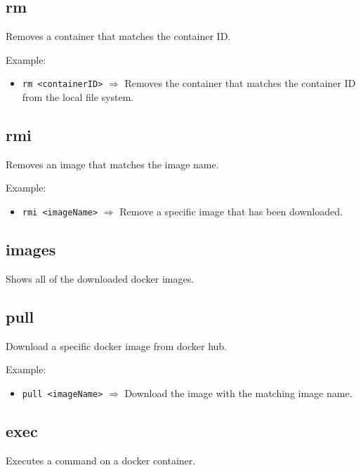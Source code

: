 \documentclass[a4paper, 12pt]{article}
\begin{document}
\subsection{rm}

Removes a container that matches the container ID.

\vspace{0.5em}
Example:
\begin{itemize}
	\item \texttt{rm <containerID>} $\Rightarrow$ Removes the container that
	matches the container ID from the local file system.
\end{itemize}

\subsection{rmi}

Removes an image that matches the image name.

\vspace{0.5em}
Example:
\begin{itemize}
	\item \texttt{rmi <imageName>} $\Rightarrow$ Remove a specific image that
	has been downloaded.
\end{itemize}

\subsection{images}

Shows all of the downloaded docker images.

\subsection{pull}

Download a specific docker image from docker hub.

\vspace{0.5em}
Example:
\begin{itemize}
	\item \texttt{pull <imageName>} $\Rightarrow$ Download the image with the
	matching image name.
\end{itemize}

\subsection{exec}

Executes a command on a docker container.
\end{document}

